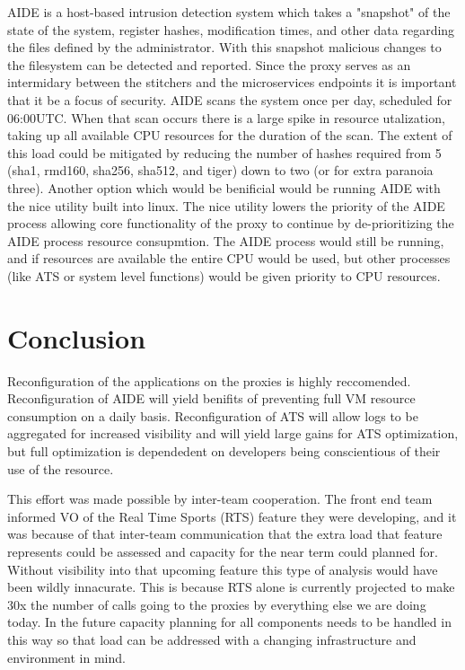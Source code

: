 \documentclass{article}
\begin{document}
AIDE is a host-based intrusion detection system which takes a "snapshot" of the state of the system, register hashes, modification times, and other data regarding the files defined by the administrator. With this snapshot malicious changes to the filesystem can be detected and reported. Since the proxy serves as an intermidary between the stitchers and the microservices endpoints it is important that it be a focus of security. AIDE scans the system once per day, scheduled for 06:00UTC. When that scan occurs there is a large spike in resource utalization, taking up all available CPU resources for the duration of the scan. The extent of this load could be mitigated by reducing the number of hashes required from 5 (sha1, rmd160, sha256, sha512, and tiger) down to two (or for extra paranoia three). Another option which would be benificial would be running AIDE with the nice utility built into linux. The nice utility lowers the priority of the AIDE process allowing core functionality of the proxy to continue by de-prioritizing the AIDE process resource consupmtion. The AIDE process would still be running, and if resources are available the entire CPU would be used, but other processes (like ATS or system level functions) would be given priority to CPU resources. 



\section{Conclusion}
\label{SECTION-Conclusion}
Reconfiguration of the applications on the proxies is highly reccomended. Reconfiguration of AIDE will yield benifits of preventing full VM resource consumption on a daily basis. Reconfiguration of ATS will allow logs to be aggregated for increased visibility and will yield large gains for ATS optimization, but full optimization is dependedent on developers being conscientious of their use of the resource. 

This effort was made possible by inter-team cooperation. The front end team informed VO of the Real Time Sports (RTS) feature they were developing, and it was because of that inter-team communication that the extra load that feature represents could be assessed and capacity for the near term could planned for. Without visibility into that upcoming feature this type of analysis would have been wildly innacurate. This is because RTS alone is currently projected to make 30x the number of calls going to the proxies by everything else we are doing today. In the future capacity planning for all components needs to be handled in this way so that load can be addressed with a changing infrastructure and environment in mind. 
\end{document}
